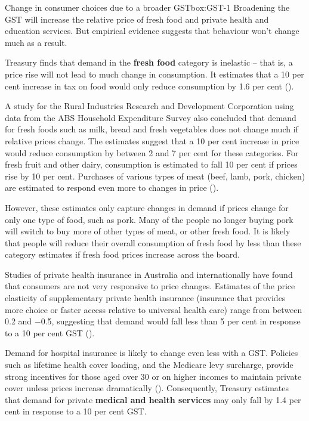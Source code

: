 \begin{bigboxC*}{Change in consumer choices due to a broader GST}{box:GST-1}
Broadening the GST will increase the relative price of fresh food and private health and education services. But empirical evidence suggests that behaviour won’t change much as a result. 

Treasury finds that demand in the \textbf{fresh food} category is inelastic – that is, a price rise will not lead to much change in consumption. It estimates that a 10 per cent increase in tax on food would only reduce consumption by 1.6 per cent (\textcite{Treasury2015TES2014}).

A study for the Rural Industries Research and Development Corporation using data from the ABS Household Expenditure Survey also concluded that demand for fresh foods such as milk, bread and fresh vegetables does not change much if relative prices change. The estimates suggest that a 10 per cent increase in price would reduce consumption by between 2 and 7 per cent for these categories. For fresh fruit and other dairy, consumption is estimated to fall 10 per cent if prices rise by 10 per cent. Purchases of various types of meat (beef, lamb, pork, chicken) are estimated to respond even more to changes in price (\textcite{UlubasogluMallickWadudEtAl2015}). 

However, these estimates only capture changes in demand if prices change for only one type of food, such as pork. Many of the people no longer buying pork will switch to buy more of other types of meat, or other fresh food. It is likely that people will reduce their overall consumption of fresh food by less than these category estimates if fresh food prices increase across the board. 

Studies of private health insurance in Australia and internationally have found that consumers are not very responsive to price changes. Estimates of the price elasticity of supplementary private health insurance (insurance that provides more choice or faster access relative to universal health care) range from between 0.2 and $-$0.5, suggesting that demand would fall less than 5 per cent in response to a 10 per cent GST (\textcite{Cheng2013-health-insurance-elasticity}). 

Demand for hospital insurance is likely to change even less with a GST. Policies such as lifetime health cover loading, and the Medicare levy surcharge, provide strong incentives for those aged over 30 or on higher incomes to maintain private cover unless prices increase dramatically (\textcite{ATO2015-Private-Health-Insurance-rebate-Medicare-levy-surcharge}). 
Consequently, Treasury estimates that demand for private \textbf{medical and health services} may only fall by 1.4 per cent in response to a 10 per cent GST. 


\end{bigboxC*}
